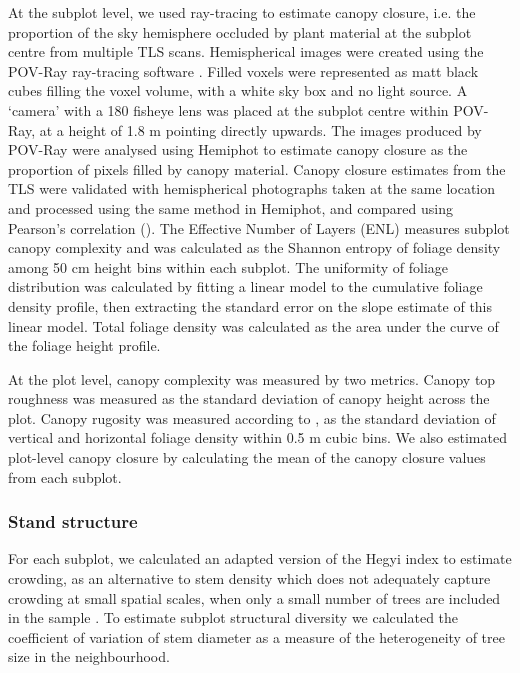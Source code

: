 \documentclass[11pt,a4paper]{article}
\begin{document}
At the subplot level, we used ray-tracing to estimate canopy closure, i.e. the proportion of the sky hemisphere occluded by plant material at the subplot centre from multiple TLS scans. Hemispherical images were created using the POV-Ray ray-tracing software \citep{Povray2004}. Filled voxels were represented as matt black cubes filling the voxel volume, with a white sky box and no light source. A `camera' with a 180\textdegree{} fisheye lens was placed at the subplot centre within POV-Ray, at a height of 1.8 m pointing directly upwards. The images produced by POV-Ray were analysed using Hemiphot \citep{HemiPhot} to estimate canopy closure as the proportion of pixels filled by canopy material. Canopy closure estimates from the TLS were validated with hemispherical photographs taken at the same location and processed using the same method in Hemiphot, and compared using Pearson's correlation (\hemiCor{}). The Effective Number of Layers (ENL) measures subplot canopy complexity and was calculated as the Shannon entropy of foliage density among 50 cm height bins within each subplot. The uniformity of foliage distribution was calculated by fitting a linear model to the cumulative foliage density profile, then extracting the standard error on the slope estimate of this linear model. Total foliage density was calculated as the area under the curve of the foliage height profile. 

At the plot level, canopy complexity was measured by two metrics. Canopy top roughness was measured as the standard deviation of canopy height across the plot. Canopy rugosity was measured according to \citet{Hardiman2011}, as the standard deviation of vertical and horizontal foliage density within 0.5 m cubic bins. We also estimated plot-level canopy closure by calculating the mean of the canopy closure values from each subplot.

\subsubsection{Stand structure}

For each subplot, we calculated an adapted version of the Hegyi index to estimate crowding, as an alternative to stem density which does not adequately capture crowding at small spatial scales, when only a small number of trees are included in the sample \citep{Hegyi1974}. To estimate subplot structural diversity we calculated the coefficient of variation of stem diameter as a measure of the heterogeneity of tree size in the neighbourhood. 
\end{document}
